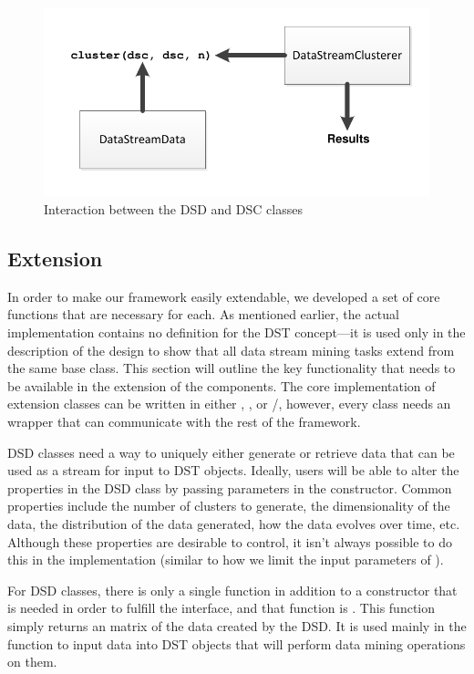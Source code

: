 \documentclass[nojss]{jss}
\begin{document}
\begin{figure}
\centering
\includegraphics{interaction}
\caption{Interaction between the DSD and DSC classes}
\label{figure:interaction}
\end{figure}

\subsection{Extension}
\label{sec:design:extension}

In order to make our framework easily extendable, we developed a set of core functions that are necessary for each. As mentioned earlier, the actual  implementation contains no definition for the DST concept---it is used only in the description of the design to show that all data stream mining tasks extend from the same base class. This section will outline the key functionality that needs to be available in the extension of the  components. The core implementation of extension classes can be written in either , , or /, however, every class needs an  wrapper that can communicate with the rest of the framework.


DSD classes need a way to uniquely either generate or retrieve data that can be used as a stream for input to DST objects. Ideally, users will be able to alter the properties in the DSD class by passing parameters in the constructor. Common properties include the number of clusters to generate, the dimensionality of the data, the distribution of the data generated, how the data evolves over time, etc. Although these properties are desirable to control, it isn't always possible to do this in the implementation (similar to how we limit the input parameters of ). 


For DSD classes, there is only a single function in addition to a constructor that is needed in order to fulfill the interface, and that function is . This function simply returns an  matrix of the data created by the DSD. It is used mainly in the  function to input data into DST objects that will perform data mining operations on them.
\end{document}
